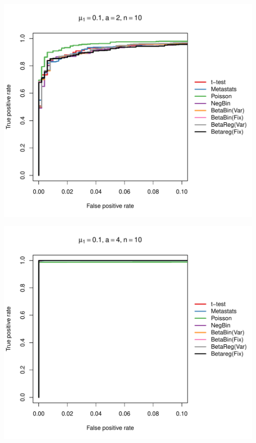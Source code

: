 \documentclass[12pt]{article}\usepackage{graphicx, color}
\makeatletter
\def\maxwidth{ %
  \ifdim\Gin@nat@width>\linewidth
    \linewidth
  \else
    \Gin@nat@width
  \fi
}
\newenvironment{knitrout}{}{} %
\makeatother
\begin{document}
\begin{knitrout}
{\centering \includegraphics[width=\maxwidth]{figure/rocs17} 

}




{\centering \includegraphics[width=\maxwidth]{figure/rocs18} 

}





\end{knitrout}
\end{document}
